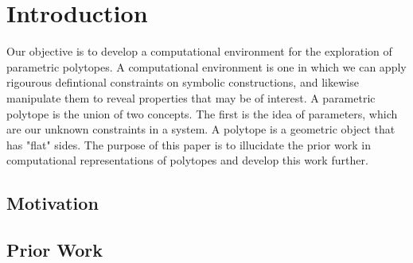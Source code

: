 \chapter{Introduction}

Our objective is to develop a computational environment for the exploration
of parametric polytopes. A computational environment is one in which
we can apply rigourous defintional constraints on symbolic constructions, and
likewise manipulate them to reveal properties that may be of interest.
A parametric polytope is the union of two concepts. The first is the idea
of parameters, which are our unknown constraints in a system. A polytope
is a geometric object that has "flat" sides. The purpose of this paper
is to illucidate the prior work in computational representations of polytopes
and develop this work further.

\section{Motivation}


\section{Prior Work}

